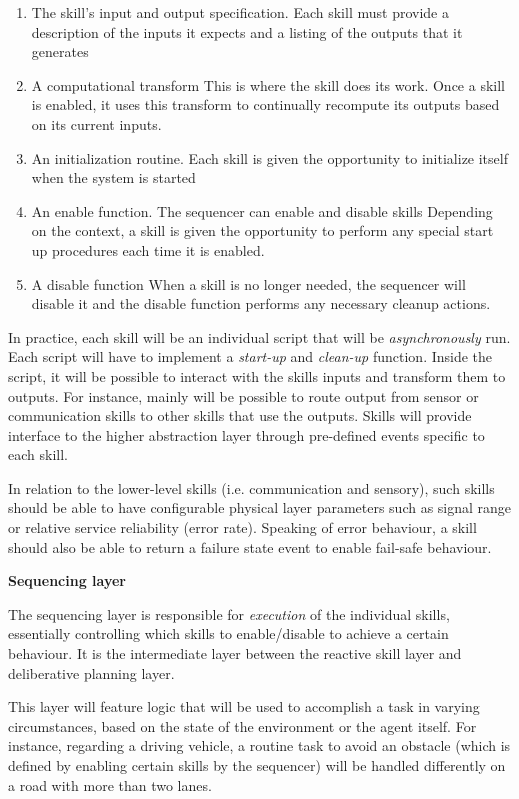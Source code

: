 \documentclass[main.tex]{subfiles}
\begin{document}
\begin{enumerate}
    \item The skill's input and output specification. Each skill must provide a
description of the inputs it expects and a listing of the outputs that it
generates 
    \item A computational transform This is where the skill does its work. Once a
skill is enabled, it uses this transform to continually recompute its outputs
based on its current inputs.
    \item An initialization routine. Each skill is given the opportunity to initialize itself when the system is started 
    \item An enable function. The sequencer can enable and disable skills Depending on the
    context, a skill is given the opportunity to perform any special start up procedures each
    time it is enabled.
    \item A disable function When a skill is no longer needed, the sequencer will disable it
    and the disable function performs any necessary cleanup actions.
\end{enumerate}

In practice, each skill will be an individual script that will be \emph{asynchronously} run.
Each script will have to implement a \emph{start-up} and \emph{clean-up} function.
Inside the script, it will be possible to interact with the skills inputs and transform them to 
outputs. For instance, mainly will be possible to route output from sensor or communication skills
to other skills that use the outputs. Skills will provide interface to the higher abstraction layer 
through pre-defined events specific to each skill.

In relation to the lower-level skills (i.e. communication and sensory), such skills should be 
able to have configurable physical layer parameters such as signal range or relative service
reliability (error rate). Speaking of error behaviour, a skill should also be able to return a
failure state event to enable fail-safe behaviour. 

\textbf{Sequencing layer}

The sequencing layer is responsible for \emph{execution} of the individual skills, essentially 
controlling which skills to enable/disable to achieve a certain behaviour. It is the 
intermediate layer between the reactive skill layer and deliberative planning layer. 

This layer will feature logic that will be used to accomplish a task in varying circumstances, 
based on the state of the environment or the agent itself. For instance, regarding a driving 
vehicle, a routine task to avoid an obstacle (which is defined by enabling certain skills by
the sequencer) will be handled differently on a road with more than two lanes.
\end{document}
